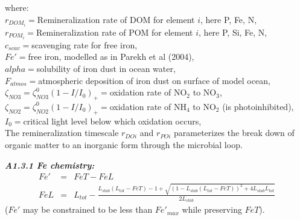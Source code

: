 \documentclass[11pt,letterpaper,english]{article}
\begin{document}
where:\\
\mbox{} \hspace{.5cm} $r_{DOM_i}=$Remineralization rate of DOM for element
$i$, here P, Fe, N,\\
\mbox{} \hspace{.5cm} $r_{POM_i}=$Remineralization rate of POM for element
$i$, here P, Si, Fe, N,\\
\mbox{} \hspace{.5cm} $c_{scav}=$scavenging rate for free iron,\\
\mbox{} \hspace{.5cm} $Fe'=$free iron, modelled as in Parekh et al (2004), \\
\mbox{} \hspace{.5cm} $alpha=$solubility of iron dust in ocean water, \\
\mbox{} \hspace{.5cm} $F_{atmos}=$atmospheric deposition of iron dust on surface of model ocean,\\
\mbox{} \hspace{.5cm} $\zeta_{NO3}=\zeta_{NO3}^0(1-I/I_0)_+=$oxidation rate of NO$_2$ to NO$_3$,\\
\mbox{} \hspace{.5cm} $\zeta_{NO2}=\zeta_{NO2}^0(1-I/I_0)_+=$oxidation rate of NH$_4$ to NO$_2$ (is photoinhibited),\\
\mbox{} \hspace{.5cm} $I_0=$critical light level below which oxidation occurs,\\

The remineralization timescale $r_{DOi}$ and $r_{POi}$ parameterizes the break
down of organic matter to an inorganic form through the microbial loop.


{\it {\bf A1.3.1 Fe chemistry:}}\\
\begin{eqnarray}
Fe' & = & FeT - FeL \nonumber \\
FeL & = & L_{tot} -
  \frac{ L_{stab} (L_{tot} - FeT) - 1
        +\sqrt{(1 - L_{stab} (L_{tot} - FeT))^2 + 4 L_{stab} L_{tot}}}
     {2 L_{stab}} \nonumber
\end{eqnarray}
($Fe'$ may be constrained to be less than $Fe'_{max}$ while preserving $FeT$).
\end{document}
